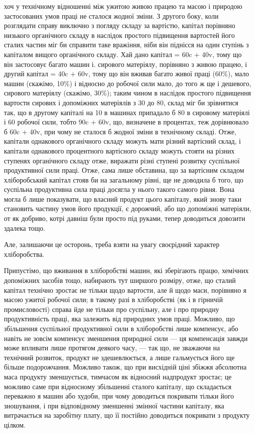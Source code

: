 \parcont{}  %
хоч у технічному відношенні між ужитою живою працею та масою і природою
застосованих умов праці не сталося жодної зміни. З другого боку, коли розглядати
справу виключно з погляду складу за вартістю, капітал порівняно низького
органічного складу в наслідок простого підвищення вартостей його сталих частин
міг би справити таке вражіння, ніби він піднісся на один ступінь з капіталом
вищого органічного складу. Хай дано капітал = 60c + 40v, тому що він
застосовує багато машин і. сирового матеріялу, порівняно з живою працею, і
другий капітал = 40c + 60v, тому що він вживав багато живої праці (60\%),
мало машин (скажімо, 10\%) і відносно до робочої сили мало, до того ж
ще і дешевого, сирового матеріялу (скажімо, 30\%); таким чином в наслідок простого
підвищення вартости сирових і допоміжних матеріялів з 30 до 80, склад
міг би зрівнятися так, що в другому капіталі на 10 в машинах припадало б 80
в сировому матеріялі і 60 робочої сили, тобто 90c + 60v, що, визначене в процентах,
теж дорівнювало б 60c + 40v, при чому не сталося б жодної зміни в технічному
складі. Отже, капітали однакового органічного складу можуть мати
різний вартісний склад, і капітали однакового процентного вартісного складу
можуть стояти на різних ступенях органічного складу отже, виражати різні ступені
розвитку суспільної продуктивної сили праці. Отже, сама лише обставина,
що за вартісним складом хліборобський капітал стояв би на загальному рівні, ще
не доводила б того, що суспільна продуктивна сила праці досягла у нього
такого самого рівня. Вона могла б лише показувати, що власний продукт цього
капіталу, який знову таки становить частину умов його продукції, є дорожчий,
або що допоміжні матеріяли, от як добриво, котрі давніш були просто під руками,
тепер доводиться довозити здалека тощо.

Але, залишаючи це осторонь, треба взяти на увагу своєрідний характер
хліборобства.

Припустімо, що вживання в хліборобстві машин, які зберігають працю,
хемічних допоміжних засобів тощо, набирають тут ширшого розміру, отже, що сталий
капітал технічно зростає не тільки щодо вартости, але й щодо маси, порівняно
я масою ужитої робочої сили; в такому разі в хліборобстві (як і в гірничій
промисловості) справа йде не тільки про суспільну, але і про природну продуктивність
праці, яка залежить від природних умов праці. Можливо, що збільшення
суспільної продуктивної сили в хліборобстві лише компенсує, або навіть
не зовсім компенсує зменшення природної сили — ця компенсація завжди може
впливати лише протягом деякого часу, — так що, не зважаючи на технічний
розвиток, продукт не здешевлюється, а лише гальмується його ще більше подорожчання.
Можливо також, що при висхідній ціні збіжжя абсолютна маса
продукту зменшується, тимчасом як відносний надпродукт зростає; це можливо
саме при відносному збільшенні сталого капіталу, що складається переважно
я машин або худоби, при чому доводиться покривати тільки його зношування,
і при відповідному зменшенні змінної частини капіталу, яка витрачається на
заробітну плату, що її постійно доводиться покривати з продукту цілком.

